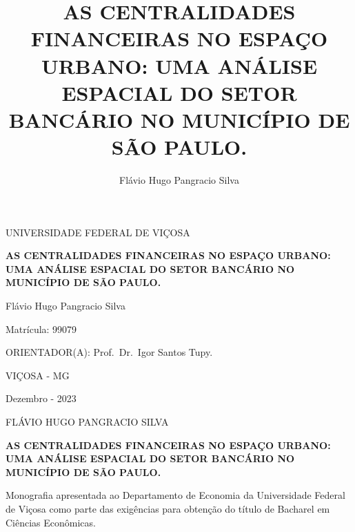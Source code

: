\documentclass[a4paper,12pt]{article}
\title{AS CENTRALIDADES FINANCEIRAS NO ESPAÇO URBANO: UMA ANÁLISE
ESPACIAL DO SETOR BANCÁRIO NO MUNICÍPIO DE SÃO PAULO.}
\author{Flávio Hugo Pangracio Silva}
\date{}
\begin{document}
\thispagestyle{empty}

\begin{center}
UNIVERSIDADE FEDERAL DE VIÇOSA
\end{center}


\vspace{4.0cm}

\begin{center}
    \textbf{AS CENTRALIDADES FINANCEIRAS NO ESPAÇO URBANO: UMA ANÁLISE
ESPACIAL DO SETOR BANCÁRIO NO MUNICÍPIO DE SÃO PAULO.}
\end{center}

\vspace{4.0cm}

\begin{center}
Flávio Hugo Pangracio Silva

Matrícula: 99079
\end{center}


\vspace{4cm}

\begin{center}

ORIENTADOR(A): Prof.~Dr.~Igor Santos Tupy.
\end{center}

\vspace{4cm}

\begin{center}

VIÇOSA - MG

Dezembro - 2023
    
\end{center}

\newpage
\thispagestyle{empty}

\begin{center}
FLÁVIO HUGO PANGRACIO SILVA
\end{center}

\vspace{1.0cm}

\begin{center}
    \textbf{AS CENTRALIDADES FINANCEIRAS NO ESPAÇO URBANO: UMA ANÁLISE
ESPACIAL DO SETOR BANCÁRIO NO MUNICÍPIO DE SÃO PAULO.}
\end{center}

\vspace{3.0cm}

\begin{adjustwidth}{7.5cm}{0cm}
    \justifying
    Monografia apresentada ao Departamento de Economia da Universidade
    Federal de Viçosa como parte das exigências para obtenção do título
    de Bacharel em Ciências Econômicas.
\end{adjustwidth}
\end{document}
